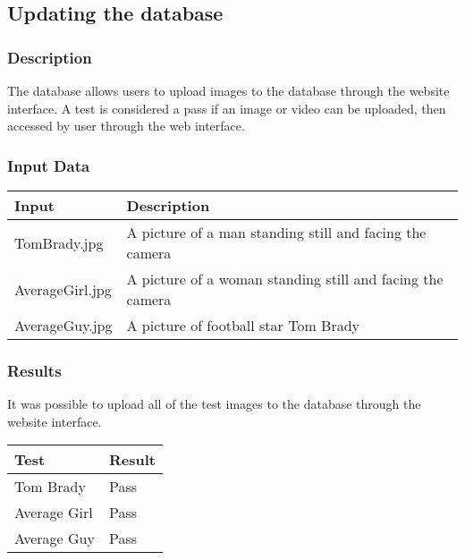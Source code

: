 \documentclass{scrreprt}
\begin{document}
\subsection{Updating the database}
\subsubsection{Description}

The database allows users to upload images to the database through the website
interface. A test is considered a pass if an image or video can be uploaded,
then accessed by user through the web interface.

\subsubsection{Input Data}

\begin{table}[H]
        \centering
        \begin{tabular}{p{3cm}p{6cm}}
                \hline\hline
                Input & Description\\
                \hline\hline
                TomBrady.jpg &  A picture of a man standing still and facing the camera\\ %
                \hline
                AverageGirl.jpg &  A picture of a woman standing still and facing the camera\\ %
                \hline
                AverageGuy.jpg &  A picture of football star Tom Brady\\ %
                \hline
        \end{tabular}
\end{table}

\subsubsection{Results}

It was possible to upload all of the test images to the database through the
website interface.

\begin{table}[H]
        \centering
        \begin{tabular}{||p{2.5cm}|p{2.5cm}||}
                \hline
                \textbf Test & \textbf Result\\
                \hline\hline
                Tom Brady & Pass  \\
                \hline\hline
                Average Girl & Pass  \\
                \hline\hline
                Average Guy & Pass  \\
                \hline
        \end{tabular}
\end{table}
\end{document}
